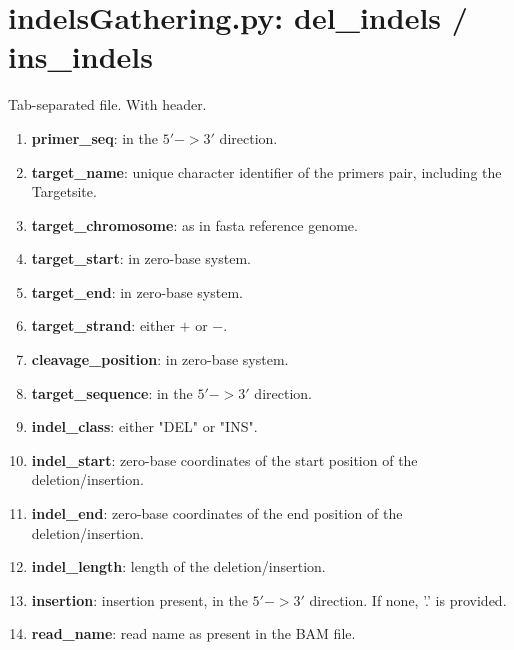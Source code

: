 \documentclass[11pt, twoside]{article}
\begin{document}
\section{indelsGathering.py: del\_indels / ins\_indels}

Tab-separated file. With header.


\begin{enumerate}
\item {\bf primer\_seq}: in the $5' -> 3'$ direction.

\item {\bf target\_name}: unique character identifier of the primers
  pair, including the Targetsite.

\item {\bf target_chromosome}: as in fasta reference genome.

\item {\bf target_start}: in zero-base system.

\item {\bf target_end}: in zero-base system.

\item {\bf target_strand}: either $+$ or $-$.

\item {\bf cleavage\_position}: in zero-base system.

\item {\bf target\_sequence}: in the $5' -> 3'$ direction.

\item {\bf indel_class}: either "DEL" or "INS".

\item {\bf indel_start}: zero-base coordinates of the start position of the deletion/insertion.

\item {\bf indel_end}: zero-base coordinates of the end position of the deletion/insertion.

\item {\bf indel_length}: length of the deletion/insertion.

\item {\bf insertion}: insertion present, in the $5' -> 3'$ direction.
  If none, '.' is provided.

\item {\bf read_name}: read name as present in the BAM file.
\end{enumerate}
\end{document}
